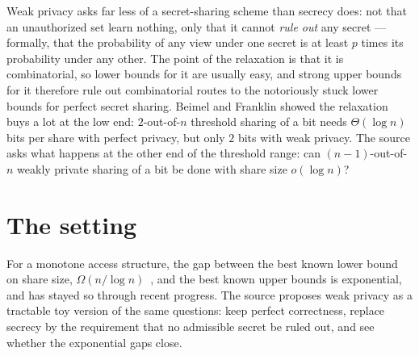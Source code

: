 \documentclass{aicr-conjecture}
\begin{document}

\vspace{0.4em}

\begin{informalconjecture}
Weak privacy asks far less of a secret-sharing scheme than secrecy does:
not that an unauthorized set learn nothing, only that it cannot
\emph{rule out} any secret --- formally, that the probability of any view
under one secret is at least $p$ times its probability under any other.
The point of the relaxation is that it is combinatorial, so lower bounds
for it are usually easy, and strong upper bounds for it therefore rule
out combinatorial routes to the notoriously stuck lower bounds for
perfect secret sharing. Beimel and Franklin showed the relaxation buys a
lot at the low end: $2$-out-of-$n$ threshold sharing of a bit needs
$\Theta(\log n)$ bits per share with perfect privacy, but only $2$ bits
with weak privacy. The source asks what happens at the other end of the
threshold range: can $(n-1)$-out-of-$n$ weakly private sharing of a bit
be done with share size $o(\log n)$?
\end{informalconjecture}

\section{The setting}\label{sec:setting}

For a monotone access structure, the gap between the best known lower
bound on share size, $\Omega(n / \log n)$~\cite{Csirmaz94}, and the best
known upper bounds is exponential, and has stayed so through recent
progress. The source proposes weak privacy as a tractable toy version of
the same questions: keep perfect correctness, replace secrecy by the
requirement that no admissible secret be ruled out, and see whether the
exponential gaps close.
\end{document}
